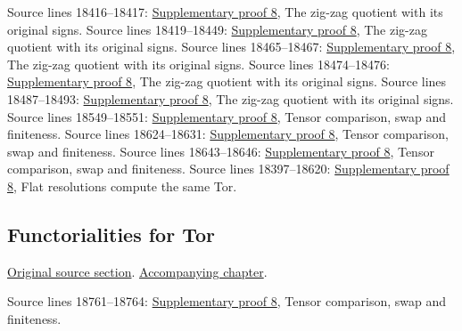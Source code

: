 \begin{AlgebraSourceRoutes}
 Source lines 18416--18417: \hyperlink{algebra_depth_tor_projective_notes_20260927}{Supplementary proof 8}, The zig-zag quotient with its original signs.
 Source lines 18419--18449: \hyperlink{algebra_depth_tor_projective_notes_20260927}{Supplementary proof 8}, The zig-zag quotient with its original signs.
 Source lines 18465--18467: \hyperlink{algebra_depth_tor_projective_notes_20260927}{Supplementary proof 8}, The zig-zag quotient with its original signs.
 Source lines 18474--18476: \hyperlink{algebra_depth_tor_projective_notes_20260927}{Supplementary proof 8}, The zig-zag quotient with its original signs.
 Source lines 18487--18493: \hyperlink{algebra_depth_tor_projective_notes_20260927}{Supplementary proof 8}, The zig-zag quotient with its original signs.
 Source lines 18549--18551: \hyperlink{algebra_depth_tor_projective_notes_20260927}{Supplementary proof 8}, Tensor comparison, swap and finiteness.
 Source lines 18624--18631: \hyperlink{algebra_depth_tor_projective_notes_20260927}{Supplementary proof 8}, Tensor comparison, swap and finiteness.
 Source lines 18643--18646: \hyperlink{algebra_depth_tor_projective_notes_20260927}{Supplementary proof 8}, Tensor comparison, swap and finiteness.
 Source lines 18397--18620: \hyperlink{algebra_depth_tor_projective_notes_20260927}{Supplementary proof 8}, Flat resolutions compute the same Tor.
\end{AlgebraSourceRoutes}

\subsection{Functorialities for Tor}
\hypertarget{algebra-source-section-functoriality-tor}{}
\noindent\href{https://github.com/stacks/stacks-project/blob/a04446e57ec1fbc252a871afcec7752fb2807b14/algebra.tex\#L18713}{Original source section}. \href{algebra.pdf\#nameddest=section-functoriality-tor}{Accompanying chapter}.

\begin{AlgebraSourceRoutes}
 Source lines 18761--18764: \hyperlink{algebra_depth_tor_projective_notes_20260927}{Supplementary proof 8}, Tensor comparison, swap and finiteness.
\end{AlgebraSourceRoutes}


